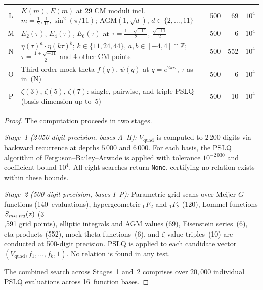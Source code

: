 \documentclass[11pt,a4paper]{article}
\theoremstyle{definition}
\theoremstyle{remark}
\newcommand{\Vq}{V_{\mathrm{quad}}}
\newcommand{\Z}{\mathbb{Z}}
\begin{document}
\begin{table}[ht]
\begin{tabular}{@{}clcrc@{}}
L & $K(m)$, $E(m)$ at 29 CM moduli incl.\
    $m = \tfrac12, \tfrac{1}{11}, \sin^2(\pi/11)$;\;
    $\mathrm{AGM}(1,\sqrt{d})$, $d \in \{2,\ldots,11\}$
  & 500 & 69 & $10^4$ \\[2pt]
M & $E_2(\tau)$, $E_4(\tau)$, $E_6(\tau)$ at
    $\tau = \tfrac{1+\sqrt{-11}}{2}$, $\tfrac{\sqrt{-11}}{2}$
  & 500 & 6 & $10^4$ \\[2pt]
N & $\eta(\tau)^a \cdot \eta(k\tau)^b$;\;
    $k \in \{11, 24, 44\}$, $a,b \in [-4, 4] \cap \Z$;\;
    $\tau = \tfrac{1+\sqrt{-11}}{2}$ and 4 other CM points
  & 500 & 552 & $10^4$ \\[2pt]
O & Third-order mock theta $f(q)$, $\psi(q)$ at
    $q = e^{2\pi i \tau}$, $\tau$ as in~(N)
  & 500 & 6 & $10^4$ \\[2pt]
P & $\zeta(3)$, $\zeta(5)$, $\zeta(7)$: single, pairwise, and
    triple PSLQ (basis dimension up to~5)
  & 500 & 10 & $10^4$ \\
\bottomrule
\end{tabular}
\end{table}

\begin{proof}
The computation proceeds in two stages.

\emph{Stage~1 (2\,050-digit precision, bases A--H):}
$\Vq$ is computed to $2\,200$ digits via backward recurrence at
depths $5\,000$ and $6\,000$.  For each basis, the PSLQ algorithm
of Ferguson--Bailey--Arwade is applied with tolerance
$10^{-2\,030}$ and coefficient bound $10^4$.  All eight searches
return \texttt{None}, certifying no relation exists within these bounds.

\emph{Stage~2 (500-digit precision, bases I--P):}
Parametric grid scans over
Meijer $G$-functions (140~evaluations),
hypergeometric ${}_0F_2$ and ${}_1F_2$ (120),
Lommel functions $S_{\\mu,\\nu}(z)$ (3\\,591 grid points),
elliptic integrals and AGM values (69),
Eisenstein series~(6),
eta products (552),
mock theta functions~(6),
and $\zeta$-value triples~(10)
are conducted at 500-digit precision.
PSLQ is applied to each candidate vector
$(\Vq, f_1, \ldots, f_k, 1)$.
No relation is found in any test.

The combined search across Stages~1 and~2 comprises over
$20{,}000$ individual PSLQ evaluations across 16~function bases.
\end{proof}
\end{document}
